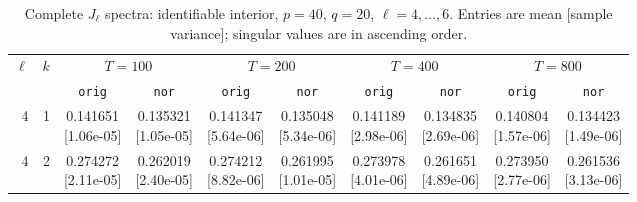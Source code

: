 \documentclass[12pt,letterpaper]{article}
\def\spacingset#1{\renewcommand{\baselinestretch}{#1}\small\normalsize}
\theoremstyle{plain}
\theoremstyle{definition}
\begin{document}
\clearpage
\begin{table}[p]
\begingroup
\spacingset{1.0}
\small\centering
\caption{Complete $J_\ell$ spectra: identifiable interior, $p=40$, $q=20$, $\ell=4,\ldots,6$. Entries are mean [sample variance]; singular values are in ascending order.}
\label{s23:lambda:alltab:spectra:p40q20interior:4-6}
\footnotesize
\setlength{\tabcolsep}{2.2pt}
\renewcommand{\arraystretch}{1.03}
\begin{adjustbox}{max width=\linewidth}
\begin{tabular}{@{}rr*{8}{c}@{}}
\toprule
$\ell$ & $k$ & \multicolumn{2}{c}{$T=100$} & \multicolumn{2}{c}{$T=200$} & \multicolumn{2}{c}{$T=400$} & \multicolumn{2}{c}{$T=800$}\\
\cmidrule(lr){3-4}\cmidrule(lr){5-6}\cmidrule(lr){7-8}\cmidrule(lr){9-10}
 &  & \texttt{orig} & \texttt{nor} & \texttt{orig} & \texttt{nor} & \texttt{orig} & \texttt{nor} & \texttt{orig} & \texttt{nor}\\
\midrule
4 & 1 & \shortstack{0.141651\\[-1pt]{\scriptsize[1.06e-05]}} & \shortstack{0.135321\\[-1pt]{\scriptsize[1.05e-05]}} & \shortstack{0.141347\\[-1pt]{\scriptsize[5.64e-06]}} & \shortstack{0.135048\\[-1pt]{\scriptsize[5.34e-06]}} & \shortstack{0.141189\\[-1pt]{\scriptsize[2.98e-06]}} & \shortstack{0.134835\\[-1pt]{\scriptsize[2.69e-06]}} & \shortstack{0.140804\\[-1pt]{\scriptsize[1.57e-06]}} & \shortstack{0.134423\\[-1pt]{\scriptsize[1.49e-06]}}\\
4 & 2 & \shortstack{0.274272\\[-1pt]{\scriptsize[2.11e-05]}} & \shortstack{0.262019\\[-1pt]{\scriptsize[2.40e-05]}} & \shortstack{0.274212\\[-1pt]{\scriptsize[8.82e-06]}} & \shortstack{0.261995\\[-1pt]{\scriptsize[1.01e-05]}} & \shortstack{0.273978\\[-1pt]{\scriptsize[4.01e-06]}} & \shortstack{0.261651\\[-1pt]{\scriptsize[4.89e-06]}} & \shortstack{0.273950\\[-1pt]{\scriptsize[2.77e-06]}} & \shortstack{0.261536\\[-1pt]{\scriptsize[3.13e-06]}}\\

\end{tabular}
\end{adjustbox}
\end{table}
\end{document}
